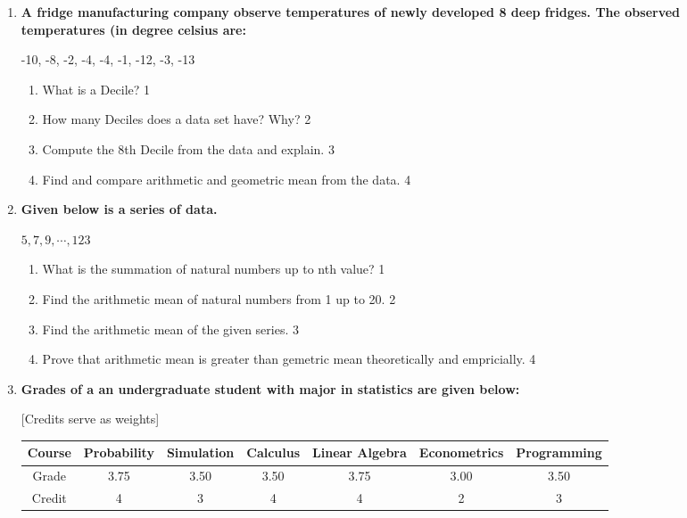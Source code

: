 \documentclass[a4paper,oneside]{book}
\begin{document}
\begin{enumerate}
   \item
	  \textbf{A fridge manufacturing company observe temperatures of newly developed 8 deep fridges. The observed temperatures (in degree celsius are:} 
	  
	    \begin{center}
-10, -8, -2, -4, -4, -1, -12, -3, -13
  \end{center}
  
  \begin{enumerate}
    \item
	What is a Decile? \hfill 1
    \item
	How many Deciles does a data set have? Why? \hfill 2
    \item  
	Compute the 8th Decile from the data and explain. \hfill 3
    \item
	Find and compare arithmetic and geometric mean from the data. \hfill 4
  \end{enumerate}
  
   \item
	  \textbf{Given below is a series of data.} 
	  
	  	    \begin{center}
	 $5, 7, 9, \cdots , 123$
	    \end{center}
  
  \begin{enumerate}
    \item
	What is the summation of natural numbers up to nth value? \hfill 1
    \item
	Find the arithmetic mean of natural numbers from 1 up to 20. \hfill 2
    \item  
	Find the arithmetic mean of the given series. \hfill 3
    \item
	Prove that arithmetic mean is greater than gemetric mean theoretically and empricially. \hfill 4
  \end{enumerate}
  
   \item
	  \textbf{Grades of a an undergraduate student with major in statistics are given below: } 
	  
	  [Credits serve as weights]

\begin{table}[h]
\centering
\begin{tabular}{c|c|c|c|c|c|c}
\hline
Course & Probability & Simulation & Calculus & Linear Algebra & Econometrics & Programming \\ \hline
Grade & 3.75 & 3.50 & 3.50 & 3.75 & 3.00 & 3.50 \\  \hline
Credit & 4 & 3 & 4 & 4 & 2 & 3 \\ \hline
\end{tabular}
\end{table}



\end{enumerate}
\end{document}
